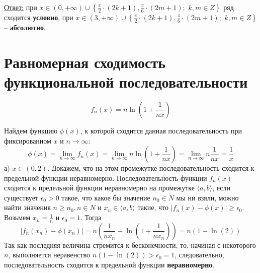 \documentclass[a5paper, 10pt]{article}
\theoremstyle{definition}
\theoremstyle{plain}
\theoremstyle{remark}
\begin{document}
\underline{Ответ:} при $x \in (0, + \infty)  \cup \left\{  \frac{\pi}{2} \cdot (2k + 1), \frac{\pi}{6} \cdot (2m + 1); \,\, k ,  m\in Z\right\}$  ряд сходится \textbf{условно}, при $x \in (3, + \infty)  \cup \left\{  \frac{\pi}{2} \cdot (2k + 1), \frac{\pi}{6} \cdot (2m + 1); \,\, k ,  m\in Z\right\}$  -- \textbf{абсолютно}.


\newpage
\section{Равномерная сходимость функциональной последовательности}
\begin{equation*}
f_n (x) = n \ln \left( 1+ \frac{1}{nx} \right)
\end{equation*}

Найдем функцию $\phi(x)$, к которой сходится данная последовательность при фиксированном $x$ и $n \to \infty$:
\begin{equation}
\phi(x) = \lim_{n \to \infty} f_n (x) = \lim_{n \to \infty} n \ln \left( 1+ \frac{1}{nx} \right) =
\lim_{n \to \infty} n  \frac{1}{nx} = \frac{1}{x}
\end{equation}
а)  $x \in (0, 2)$. Докажем, что на этом промежутке последовательность сходится к предельной функции неравномерно. Последовательность функции $f_n (x)$ сходится к предельной функции неравномерно на промежутке $\langle a, b \rangle$, если существует $\epsilon_0 > 0$ такое, что какое бы значение $n_0 \in N$ мы ни взяли, можно найти значения $n \geq n_0, n \in N$ и $x_n \in \langle a, b \rangle$ такие, что $\left| f_n (x) - \phi(x)  \right| \geq \epsilon_0$. \\
Возьмем $x_n = \frac{1}{n}$ и $\epsilon_0 = 1$. Тогда
\begin{equation*}
\left| f_n (x_n) - \phi(x_n)  \right| = n \left( \frac{1}{nx_n}- \ln \left( 1+ \frac{1}{nx_n} \right)  \right) =  
 n \left( 1- \ln \left( 2 \right)  \right)
\end{equation*}
Так как последняя величина стремится к бесконечности, то, начиная с некоторого $n$, выполняется неравенство $ n \left( 1- \ln \left( 2 \right)  \right) > \epsilon_0 = 1$, следовательно, последовательность сходится к предельной функции \textbf{неравномерно}.\\
\end{document}
